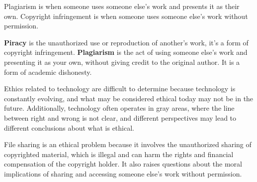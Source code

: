 \documentclass{report}
\begin{document}
    Plagiarism is when someone uses someone else's work and presents it as their own. 
    Copyright infringement is when someone uses someone else's work without permission.
    \bigbreak \noindent 

    \textbf{Piracy} is the unauthorized use or reproduction of another's work, it's a form of copyright infringement.
    \textbf{Plagiarism} is the act of using someone else's work and presenting it as your own, 
    without giving credit to the original author. It is a form of academic dishonesty.
    \bigbreak \noindent 

    Ethics related to technology are difficult to determine because technology is 
    constantly evolving, and what may be considered ethical today may not be in the 
    future. Additionally, technology often operates in gray areas, where the line 
    between right and wrong is not clear, and different perspectives may lead to different 
    conclusions about what is ethical.
    \bigbreak \noindent 

    File sharing is an ethical problem because it involves the unauthorized 
    sharing of copyrighted material, which is illegal and can harm the rights 
    and financial compensation of the copyright holder. It also raises questions 
    about the moral implications of sharing and accessing someone else's work without 
    permission.
    \bigbreak \noindent 
\end{document}
